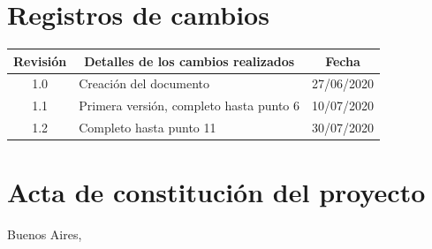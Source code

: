 \documentclass[11pt]{charter}
\begin{document}
\maketitle
\thispagestyle{empty}
\pagebreak


\thispagestyle{empty}
{\setlength{\parskip}{0pt}
\tableofcontents{}
}
\pagebreak


\section{Registros de cambios}
\label{sec:registro}


\begin{table}[ht]
\label{tab:registro}
\centering

\begin{tabularx}{\linewidth}{@{}|c|X|c|@{}}
\hline
\rowcolor[HTML]{C0C0C0} 
Revisión & \multicolumn{1}{c|}{\cellcolor[HTML]{C0C0C0}Detalles de los cambios realizados} & Fecha      \\ \hline
1.0      & Creación del documento                                                          & 27/06/2020 \\ \hline
1.1      & Primera versión, completo hasta punto 6                                                                                																						   & 10/07/2020 \\ \hline
1.2      & Completo hasta punto 11 																						   & 30/07/2020 \\ \hline
\end{tabularx}
\end{table}

\pagebreak



\section{Acta de constitución del proyecto}
\label{sec:acta}

\begin{flushright}
Buenos Aires, \fechaInicioName
\end{flushright}

\vspace{2cm}
\end{document}
